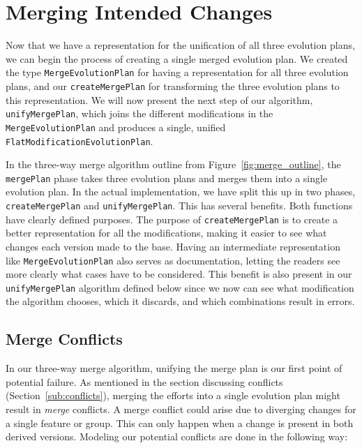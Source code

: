 \documentclass[a4paper,english]{ifimaster}
\begin{document}
\section{Merging Intended Changes}%
\label{sec:merging_intended_changes}

Now that we have a representation for the unification of all three evolution plans, we can begin the process of creating a single merged evolution plan. We created the type \texttt{Merge\-Evolution\-Plan} for having a representation for all three evolution plans, and our \texttt{create\-Merge\-Plan} for transforming the three evolution plans to this representation. We will now present the next step of our algorithm, \texttt{unify\-Merge\-Plan}, which joins the different modifications in the \texttt{Merge\-Evolution\-Plan} and produces a single, unified \texttt{Flat\-Modification\-Evolution\-Plan}.

In the three-way merge algorithm outline from Figure~\vref{fig:merge_outline}, the \texttt{mergePlan} phase takes three evolution plans and merges them into a single evolution plan. In the actual implementation, we have split this up in two phases, \texttt{create\-Merge\-Plan} and \texttt{unify\-Merge\-Plan}. This has several benefits. Both functions have clearly defined purposes. The purpose of \texttt{create\-Merge\-Plan} is to create a better representation for all the modifications, making it easier to see what changes each version made to the base. Having an intermediate representation like \texttt{Merge\-Evolution\-Plan} also serves as documentation, letting the readers see more clearly what cases have to be considered. This benefit is also present in our \texttt{unify\-Merge\-Plan} algorithm defined below since we now can see what modification the algorithm chooses, which it discards, and which combinations result in errors.

\subsection{Merge Conflicts}%
\label{sub:merge_errors}

In our three-way merge algorithm, unifying the merge plan is our first point of potential failure. As mentioned in the section discussing conflicts (Section~\vref{sub:conflicts}), merging the efforts into a single evolution plan might result in \textit{merge} conflicts. A merge conflict could arise due to diverging changes for a single feature or group. This can only happen when a change is present in both derived versions. Modeling our potential conflicts are done in the following way:
\end{document}
